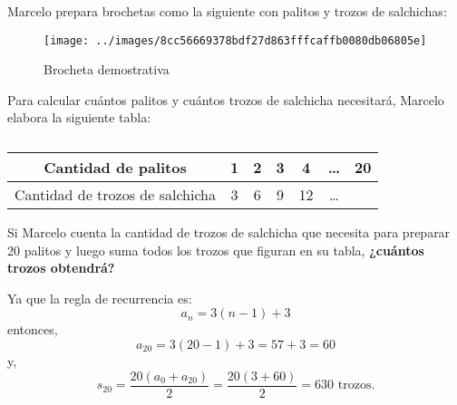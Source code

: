 Marcelo prepara brochetas como la siguiente con palitos y trozos de salchichas:

\begin{minipage}{0.4\linewidth}
    \begin{figure}[H]
        \centering
        \texttt{[image: ../images/8cc56669378bdf27d863fffcaffb0080db06805e]}
        \caption{Brocheta demostrativa}
        \label{fig:8cc56669378bdf27d863fffcaffb0080db06805e}
    \end{figure}
\end{minipage}\hfill
\begin{minipage}{0.6\linewidth}
    Para calcular cuántos palitos y cuántos trozos de salchicha necesitará, Marcelo elabora la siguiente tabla:

    \begin{table}[H]
        \centering
        \caption{}
        \label{tab:estampillas}
        \begin{tabular}{c|c|c|c|c|c|c}
            Cantidad de palitos             & 1 & 2 & 3 & 4  & \dots & 20 \\ \hline
            Cantidad de trozos de salchicha & 3 & 6 & 9 & 12 & \dots &    \\
        \end{tabular}
    \end{table}


    Si Marcelo cuenta la cantidad de trozos de salchicha que necesita para preparar
    20 palitos y luego suma todos los trozos que figuran en su tabla,
    \textbf{¿cuántos trozos obtendrá?}\\
\end{minipage}

\begin{solutionbox}{4cm}
    Ya que la regla de recurrencia es:
    \[a_n=3(n-1)+3\]
    entonces,
    \[a_{20}=3(20-1)+3=57+3=60\]
    y,
    \[s_{20}=\dfrac{20(a_0+a_{20})}{2}=\dfrac{20(3+60)}{2}=630 \text{ trozos.}\]
\end{solutionbox}
